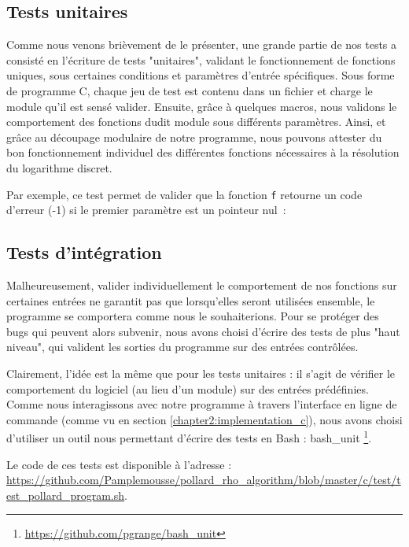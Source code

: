       \subsection{Tests unitaires}
      Comme nous venons brièvement de le présenter, une grande partie de nos tests a consisté en l'écriture de tests "unitaires", validant le fonctionnement de fonctions uniques, sous certaines conditions et paramètres d'entrée spécifiques.
      Sous forme de programme C, chaque jeu de test est contenu dans un fichier et charge le module qu'il est sensé valider. Ensuite, grâce à quelques macros, nous validons le comportement des fonctions dudit module sous différents paramètres.
      Ainsi, et grâce au découpage modulaire de notre programme, nous pouvons attester du bon fonctionnement individuel des différentes fonctions nécessaires à la résolution du logarithme discret.

      Par exemple, ce test permet de valider que la fonction \lstinline{f} retourne un code d'erreur (-1) si le premier paramètre est un pointeur nul~:

      


      \subsection{Tests d'intégration}
      Malheureusement, valider individuellement le comportement de nos fonctions sur certaines entrées ne garantit pas que lorsqu'elles seront utilisées ensemble, le programme se comportera comme nous le souhaiterions.
      Pour se protéger des bugs qui peuvent alors subvenir, nous avons choisi d'écrire des tests de plus "haut niveau", qui valident les sorties du programme sur des entrées contrôlées.

      Clairement, l'idée est la même que pour les tests unitaires : il s'agit de vérifier le comportement du logiciel (au lieu d'un module) sur des entrées prédéfinies. Comme nous interagissons avec notre programme à travers l'interface en ligne de commande (comme vu en section \ref{chapter2:implementation_c}), nous avons choisi d'utiliser un outil nous permettant d'écrire des tests en Bash : bash\_unit \footnote{\url{https://github.com/pgrange/bash_unit}}.

      \begin{sloppypar}
        Le code de ces tests est disponible à l'adresse : \url{https://github.com/Pamplemousse/pollard_rho_algorithm/blob/master/c/test/test_pollard_program.sh}.
      \end{sloppypar}

